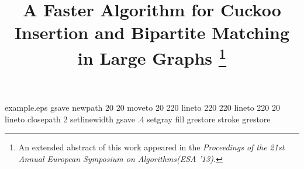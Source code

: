 %
%
%
%
%
\begin{filecontents*}{example.eps}
gsave
newpath
  20 20 moveto
  20 220 lineto
  220 220 lineto
  220 20 lineto
closepath
2 setlinewidth
gsave
  .4 setgray fill
grestore
stroke
grestore
\end{filecontents*}
%
\RequirePackage{fix-cm}
%
\documentclass[smallextended]{svjour3}       %
%
\smartqed  %
%
\usepackage{graphicx}
%
%
%
%
%


\usepackage{color}
\usepackage{amsfonts,amsmath,algorithm,graphicx,subfigure}
\usepackage{booktabs} 
\usepackage[noend]{algorithmic}

\newcommand{\la}{\ell}





\title{A Faster Algorithm for Cuckoo Insertion and Bipartite Matching in Large Graphs \footnote{An extended abstract of this work appeared in the \emph{Proceedings of the 21st Annual European Symposium on Algorithms(ESA '13).}}%
}

